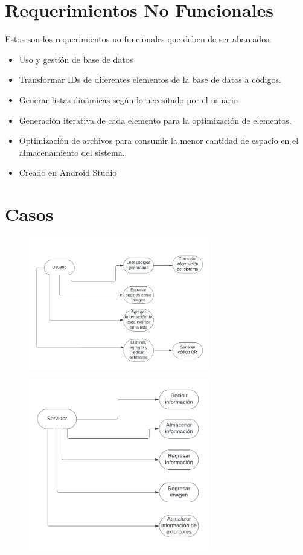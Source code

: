 \documentclass[a4paper,twoside,10pt]{report}
\begin{document}
\section{Requerimientos No Funcionales}

\par Estos son los requerimientos no funcionales que deben de ser abarcados:
\begin{itemize}
	\item Uso y gestión de base de datos 
	\item Transformar IDs de diferentes elementos de la base de datos a códigos. 
	\item Generar listas dinámicas según lo necesitado por el usuario
	\item Generación iterativa de cada elemento para la optimización de elementos. 
	\item Optimización de archivos para consumir la menor cantidad de espacio en el almacenamiento del sistema. 
	\item Creado en Android Studio
\end{itemize}

\section{Casos}

\begin{figure}[htbp]
	\centering
		\includegraphics[width=0.70\textwidth]{Gaming1.png}
	\label{fig:Gaming1}
\end{figure}

\begin{figure}[htbp]
	\centering
		\includegraphics[width=0.70\textwidth]{Gmaing2.png}
	\label{fig:Gmaing2}
\end{figure}
\end{document}
